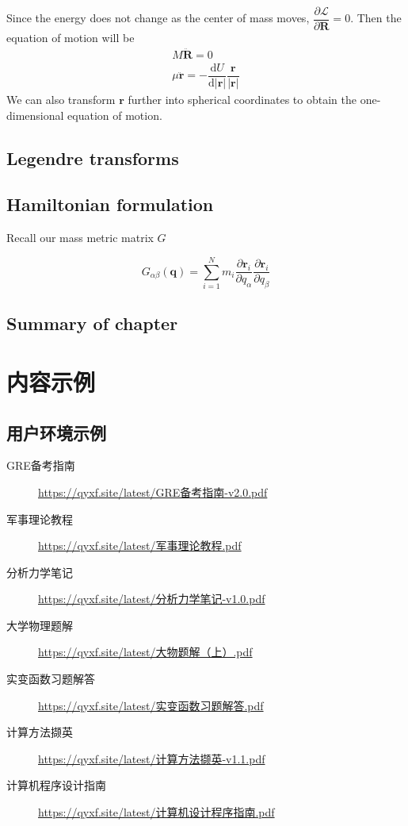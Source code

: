 \documentclass[
  10pt,
  twoside,
  openany,
  b5paper, %
  colorscheme = bootstrap-v4, %
]{qyxf-book}
\newcommand{\der}[2]{\dfrac{\md #1}{\md #2}}
\newcommand{\p}[2]{\dfrac{\partial #1}{\partial #2}}
\newcommand{\md}{\mathrm{d}}
\newcommand{\vr}{\boldsymbol{r}}
\newcommand{\ddvr}{\ddot{\vr}}
\newcommand{\sumin}{\sum_{i=1}^N}
\newcommand{\lag}{\mathcal{L}} %
\begin{document}
Since the energy does not change as the center of mass moves, $\p{\lag}{\boldsymbol{R}}=0$. Then the equation of motion will be
\begin{gather*}
	M\ddot{\boldsymbol{R}}=0\\
	\mu\ddvr=-\der{U}{|\vr|}\dfrac{\vr}{|\vr|}
\end{gather*}
We can also transform $\vr$ further into spherical coordinates to obtain the one-dimensional equation of motion.

\section{Legendre transforms}


\section{Hamiltonian formulation}


Recall our mass metric matrix $G$

\begin{equation}
	G_{\alpha\beta}(\boldsymbol{q})=\sumin m_i\p{\vr_i}{q_\alpha}\p{\vr_i}{q_\beta}
\end{equation}

\section{Summary of chapter}










\chapter{内容示例}
\section{用户环境示例}

\begin{tcolorbox}
	\begin{description}
		\item [GRE备考指南] \url{https://qyxf.site/latest/GRE备考指南-v2.0.pdf}
		\item [军事理论教程] \url{https://qyxf.site/latest/军事理论教程.pdf}
		\item [分析力学笔记] \url{https://qyxf.site/latest/分析力学笔记-v1.0.pdf}
		\item [大学物理题解] \url{https://qyxf.site/latest/大物题解（上）.pdf}
		\item [实变函数习题解答] \url{https://qyxf.site/latest/实变函数习题解答.pdf}
		\item [计算方法撷英] \url{https://qyxf.site/latest/计算方法撷英-v1.1.pdf}
		\item [计算机程序设计指南] \url{https://qyxf.site/latest/计算机设计程序指南.pdf}
	\end{description}
\end{tcolorbox}
\end{document}
